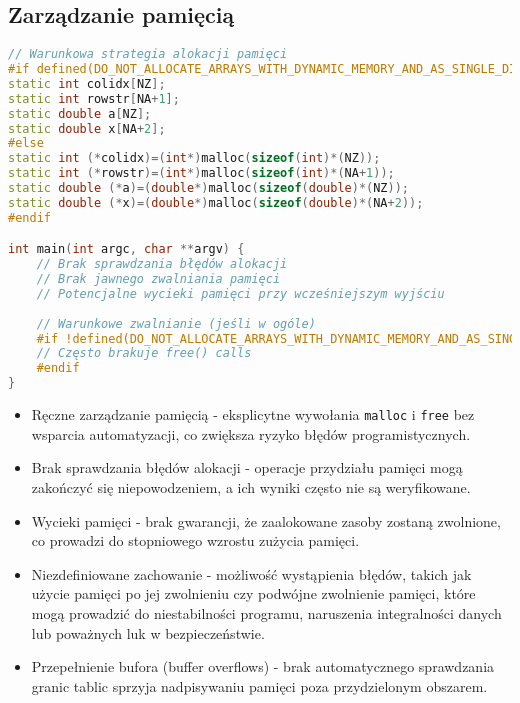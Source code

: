 \subsection{Zarządzanie pamięcią}
\begin{lstlisting}[language=C++, style=VS2017,  caption={Zarządzanie pamięcią w benchmarkach C++ z OpenMP}, label={lst:openmp_memory}]
// Warunkowa strategia alokacji pamięci
#if defined(DO_NOT_ALLOCATE_ARRAYS_WITH_DYNAMIC_MEMORY_AND_AS_SINGLE_DIMENSION)
static int colidx[NZ];
static int rowstr[NA+1];
static double a[NZ];
static double x[NA+2];
#else
static int (*colidx)=(int*)malloc(sizeof(int)*(NZ));
static int (*rowstr)=(int*)malloc(sizeof(int)*(NA+1));
static double (*a)=(double*)malloc(sizeof(double)*(NZ));
static double (*x)=(double*)malloc(sizeof(double)*(NA+2));
#endif

int main(int argc, char **argv) {
    // Brak sprawdzania błędów alokacji
    // Brak jawnego zwalniania pamięci
    // Potencjalne wycieki pamięci przy wcześniejszym wyjściu
    
    // Warunkowe zwalnianie (jeśli w ogóle)
    #if !defined(DO_NOT_ALLOCATE_ARRAYS_WITH_DYNAMIC_MEMORY_AND_AS_SINGLE_DIMENSION)
    // Często brakuje free() calls
    #endif
}
\end{lstlisting}
\begin{itemize}
    \item Ręczne zarządzanie pamięcią - eksplicytne wywołania \texttt{malloc} i \texttt{free} bez wsparcia automatyzacji, co zwiększa ryzyko błędów programistycznych.
    
    \item Brak sprawdzania błędów alokacji - operacje przydziału pamięci mogą zakończyć się niepowodzeniem, a ich wyniki często nie są weryfikowane.
    
    \item Wycieki pamięci - brak gwarancji, że zaalokowane zasoby zostaną zwolnione, co prowadzi do stopniowego wzrostu zużycia pamięci.
    
    \item Niezdefiniowane zachowanie - możliwość wystąpienia błędów, takich jak użycie pamięci po jej zwolnieniu czy podwójne zwolnienie pamięci, które mogą prowadzić do niestabilności programu, naruszenia integralności danych lub poważnych luk w bezpieczeństwie.
    
    \item Przepełnienie bufora (buffer overflows) - brak automatycznego sprawdzania granic tablic sprzyja nadpisywaniu pamięci poza przydzielonym obszarem.
\end{itemize}
  
